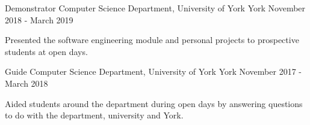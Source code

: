 
\begin{cventries}
  \cventry
    {Demonstrator} %
    {Computer Science Department, University of York} %
    {York} %
    {November 2018 - March 2019} %
    {
      \begin{cvitems} %
        \item {Presented the software engineering module and personal projects to prospective students at open days.}
      \end{cvitems}
    }

  \cventry
    {Guide} %
    {Computer Science Department, University of York} %
    {York} %
    {November 2017 - March 2018} %
    {
      \begin{cvitems} %
        \item {Aided students around the department during open days by answering questions to do with the department, university and York.}
      \end{cvitems}
    }

\end{cventries}
